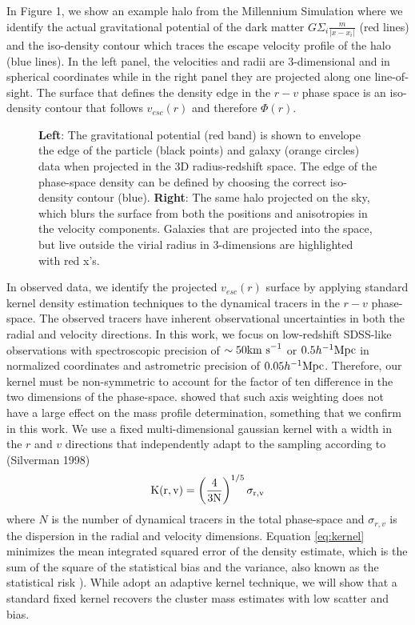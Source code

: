 \documentclass[iop]{emulateapj}
\begin{document}
        In Figure 1, we show an example halo from the Millennium Simulation where we identify the actual gravitational potential of the dark matter $G \Sigma_i \frac{m}{|x -x_i|}$ (red lines) and the iso-density contour which traces the escape velocity profile of the halo (blue lines). In the left panel, the velocities and radii are 3-dimensional and in spherical coordinates while in the right panel they are projected along one line-of-sight. The surface that defines the density edge in the $r-v$ phase space is an iso-density contour that follows $v_{esc}(r)$ and therefore $\Phi(r)$.
        
        \begin{figure*}
        \caption{{\bf Left}: The gravitational potential (red band) is shown to envelope the edge of the particle (black points) and galaxy (orange circles) data when projected in the 3D radius-redshift space. The edge of the phase-space density can be defined by choosing the correct iso-density contour (blue). {\bf Right}: The same halo projected on the sky, which blurs the surface from both the positions and anisotropies in the velocity components. Galaxies that are projected into the space, but live outside the virial radius in 3-dimensions are highlighted with red x's.  
        \label{fig:caustics}}
        \end{figure*}
        
        
        In observed data, we identify the projected $v_{esc}(r)$ surface by applying standard kernel density estimation techniques to the dynamical tracers in the $r-v$ phase-space. The observed tracers have inherent observational uncertainties in both the radial and velocity directions. In this work, we focus on low-redshift SDSS-like observations with spectroscopic precision of $\sim 50 \rm{km\ s}^{-1}$ or $0.5 h^{-1} \rm{Mpc}$ in normalized coordinates and astrometric precision of  $0.05 h^{-1} \rm{Mpc}$. Therefore, our kernel must be non-symmetric to account for the factor of ten difference in the two dimensions of the phase-space. \citet{Geller99} showed that such axis weighting does not have a large effect on the mass profile determination, something that we confirm in this work. We use a fixed multi-dimensional gaussian kernel with a width in the $r$ and $v$ directions that independently adapt to the sampling according to (Silverman 1998)
        \begin{equation}
            \rm{K(}r,v\rm{)} = \left(\frac{4}{3 N}\right )^{1/5}\sigma_{r,v}
            \label{eq:kernel}
        \end{equation}
        where $N$ is the number of dynamical tracers in the total phase-space and $\sigma_{r,v}$ is the dispersion in the radial and velocity dimensions. Equation \ref{eq:kernel} minimizes the mean integrated squared error of the density estimate, which is the sum of the square of the statistical bias and the variance, also known as the statistical risk \citep{Stien81, Miller02}). While \citet{Diaferio99} adopt an adaptive kernel technique, we will show that a standard fixed kernel recovers the cluster mass estimates with low scatter and bias.
        
\end{document}
